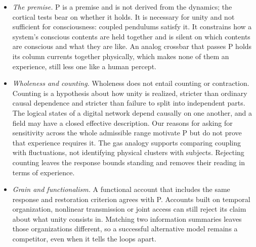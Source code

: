 \documentclass[12pt]{article}
\begin{document}
\begin{itemize}
\item \emph{The premise.} P is a premise and is not derived from the dynamics;
the cortical tests bear on whether it holds. It is necessary for unity and not
sufficient for consciousness: coupled pendulums satisfy it. It constrains how a
system's conscious contents are held together and is silent on which contents
are conscious and what they are like. An analog crossbar that passes P holds its
column currents together physically, which makes none of them an experience,
still less one like a human percept.

\item \emph{Wholeness and counting.} Wholeness does not entail counting or
contraction. Counting is a hypothesis about how unity is realized, stricter
than ordinary causal dependence and stricter than failure to split into
independent parts. The logical states of a digital network depend causally on
one another, and a field may have a closed effective description. Our reasons
for asking for sensitivity across the whole admissible range motivate P but do
not prove that experience requires it. The gas analogy supports comparing
coupling with fluctuations, not identifying physical clusters with subjects.
Rejecting counting leaves the response bounds standing and removes their
reading in terms of experience.

\item \emph{Grain and functionalism.} A functional account that includes the
same response and restoration criterion agrees with P. Accounts built on
temporal organization, nonlinear transmission or joint access can still reject
its claim about what unity consists in. Matching two information summaries
leaves those organizations different, so a successful alternative model
remains a competitor, even when it tells the loops apart.


\end{itemize}
\end{document}
